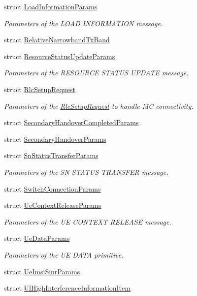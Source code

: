 \begin{DoxyCompactItemize}
struct \hyperlink{structns3_1_1EpcX2Sap_1_1LoadInformationParams}{Load\+Information\+Params}
\begin{DoxyCompactList}\small\item\em Parameters of the L\+O\+AD I\+N\+F\+O\+R\+M\+A\+T\+I\+ON message. \end{DoxyCompactList}\item 
struct \hyperlink{structns3_1_1EpcX2Sap_1_1RelativeNarrowbandTxBand}{Relative\+Narrowband\+Tx\+Band}
\item 
struct \hyperlink{structns3_1_1EpcX2Sap_1_1ResourceStatusUpdateParams}{Resource\+Status\+Update\+Params}
\begin{DoxyCompactList}\small\item\em Parameters of the R\+E\+S\+O\+U\+R\+CE S\+T\+A\+T\+US U\+P\+D\+A\+TE message. \end{DoxyCompactList}\item 
struct \hyperlink{structns3_1_1EpcX2Sap_1_1RlcSetupRequest}{Rlc\+Setup\+Request}
\begin{DoxyCompactList}\small\item\em Parameters of the \hyperlink{structns3_1_1EpcX2Sap_1_1RlcSetupRequest}{Rlc\+Setup\+Request} to handle MC connectivity. \end{DoxyCompactList}\item 
struct \hyperlink{structns3_1_1EpcX2Sap_1_1SecondaryHandoverCompletedParams}{Secondary\+Handover\+Completed\+Params}
\item 
struct \hyperlink{structns3_1_1EpcX2Sap_1_1SecondaryHandoverParams}{Secondary\+Handover\+Params}
\item 
struct \hyperlink{structns3_1_1EpcX2Sap_1_1SnStatusTransferParams}{Sn\+Status\+Transfer\+Params}
\begin{DoxyCompactList}\small\item\em Parameters of the SN S\+T\+A\+T\+US T\+R\+A\+N\+S\+F\+ER message. \end{DoxyCompactList}\item 
struct \hyperlink{structns3_1_1EpcX2Sap_1_1SwitchConnectionParams}{Switch\+Connection\+Params}
\item 
struct \hyperlink{structns3_1_1EpcX2Sap_1_1UeContextReleaseParams}{Ue\+Context\+Release\+Params}
\begin{DoxyCompactList}\small\item\em Parameters of the UE C\+O\+N\+T\+E\+XT R\+E\+L\+E\+A\+SE message. \end{DoxyCompactList}\item 
struct \hyperlink{structns3_1_1EpcX2Sap_1_1UeDataParams}{Ue\+Data\+Params}
\begin{DoxyCompactList}\small\item\em Parameters of the UE D\+A\+TA primitive. \end{DoxyCompactList}\item 
struct \hyperlink{structns3_1_1EpcX2Sap_1_1UeImsiSinrParams}{Ue\+Imsi\+Sinr\+Params}
\item 
struct \hyperlink{structns3_1_1EpcX2Sap_1_1UlHighInterferenceInformationItem}{Ul\+High\+Interference\+Information\+Item}
\end{DoxyCompactItemize}
